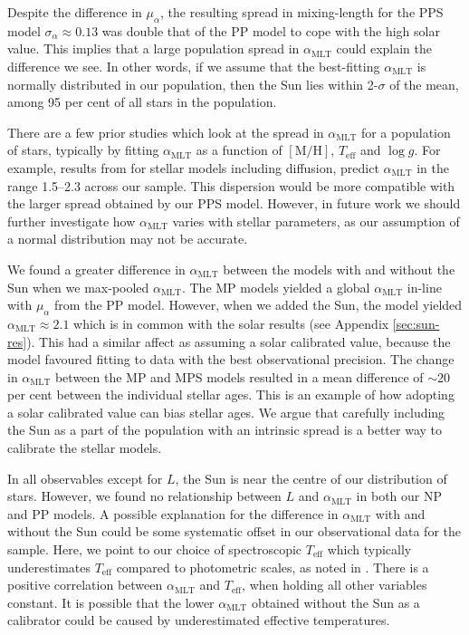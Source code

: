 \documentclass[a4paper,fleqn,usenatbib]{mnras}
\newcommand{\metallicity}{\ensuremath{[\mathrm{M}/\mathrm{H}]}}
\newcommand{\teff}{\ensuremath{T_\mathrm{eff}}}
\newcommand{\mlt}{\ensuremath{{\alpha_\mathrm{MLT}}}}
\begin{document}
Despite the difference in $\mu_\alpha$, the resulting spread in mixing-length for the PPS model $\sigma_\alpha \approx 0.13$ was double that of the PP model to cope with the high solar value. This implies that a large population spread in $\mlt$ could explain the difference we see. In other words, if we assume that the best-fitting $\mlt$ is normally distributed in our population, then the Sun lies within 2-$\sigma$ of the mean, among 95 per cent of all stars in the population. 

There are a few prior studies which look at the spread in $\mlt$ for a population of stars, typically by fitting $\mlt$ as a function of $\metallicity$, $\teff$ and $\log g$. For example, results from \citet{Viani.Basu.ea2018} for stellar models including diffusion, predict $\mlt$ in the range \numrange{1.5}{2.3} across our sample. This dispersion would be more compatible with the larger spread obtained by our PPS model. However, in future work we should further investigate how $\mlt$ varies with stellar parameters, as our assumption of a normal distribution may not be accurate.

We found a greater difference in $\mlt$ between the models with and without the Sun when we max-pooled $\mlt$. The MP models yielded a global $\mlt$ in-line with $\mu_\alpha$ from the PP model. However, when we added the Sun, the model yielded $\mlt \approx 2.1$ which is in common with the solar results (see Appendix \ref{sec:sun-res}). This had a similar affect as assuming a solar calibrated value, because the model favoured fitting to data with the best observational precision. The change in $\mlt$ between the MP and MPS models resulted in a mean difference of $\sim 20$ per cent between the individual stellar ages. This is an example of how adopting a solar calibrated value can bias stellar ages. We argue that carefully including the Sun as a part of the population with an intrinsic spread is a better way to calibrate the stellar models.

In all observables except for $L$, the Sun is near the centre of our distribution of stars. However, we found no relationship between $L$ and $\mlt$ in both our NP and PP models. A possible explanation for the difference in $\mlt$ with and without the Sun could be some systematic offset in our observational data for the sample. Here, we point to our choice of spectroscopic $\teff$ which typically underestimates $\teff$ compared to photometric scales, as noted in . There is a positive correlation between $\mlt$ and $\teff$, when holding all other variables constant. It is possible that the lower $\mlt$ obtained without the Sun as a calibrator could be caused by underestimated effective temperatures.
\end{document}
